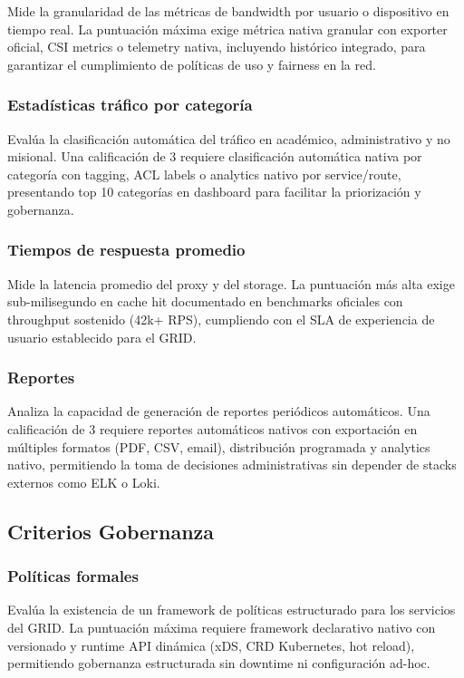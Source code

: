 Mide la granularidad de las métricas de bandwidth por usuario o dispositivo en tiempo real. La puntuación máxima exige métrica nativa granular con exporter oficial, CSI metrics o telemetry nativa, incluyendo histórico integrado, para garantizar el cumplimiento de políticas de uso y fairness en la red.

\subsubsection{Estadísticas tráfico por categoría}

Evalúa la clasificación automática del tráfico en académico, administrativo y no misional. Una calificación de 3 requiere clasificación automática nativa por categoría con tagging, ACL labels o analytics nativo por service/route, presentando top 10 categorías en dashboard para facilitar la priorización y gobernanza.

\subsubsection{Tiempos de respuesta promedio}

Mide la latencia promedio del proxy y del storage. La puntuación más alta exige sub-milisegundo en cache hit documentado en benchmarks oficiales con throughput sostenido (42k+ RPS), cumpliendo con el SLA de experiencia de usuario establecido para el GRID.

\subsubsection{Reportes}

Analiza la capacidad de generación de reportes periódicos automáticos. Una calificación de 3 requiere reportes automáticos nativos con exportación en múltiples formatos (PDF, CSV, email), distribución programada y analytics nativo, permitiendo la toma de decisiones administrativas sin depender de stacks externos como ELK o Loki.

\subsection{Criterios Gobernanza}

\subsubsection{Políticas formales}

Evalúa la existencia de un framework de políticas estructurado para los servicios del GRID. La puntuación máxima requiere framework declarativo nativo con versionado y runtime API dinámica (xDS, CRD Kubernetes, hot reload), permitiendo gobernanza estructurada sin downtime ni configuración ad-hoc.

